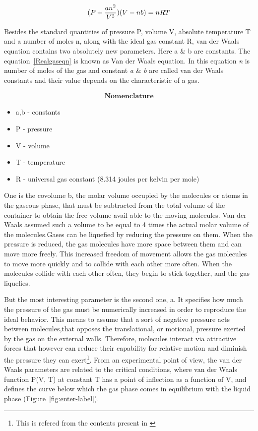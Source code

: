 \documentclass[12pt,a4paper]{article}
\begin{document}
\begin{equation}
	\text(P + \frac{an^2}{V^2})(V - nb) = nRT
        \label{Realgaseqn}
\end{equation}

Besides the standard quantities of pressure P, volume V, absolute temperature T and a number of moles n, along with the ideal gas constant R, van der Waals equation contains two absolutely new parameters. Here a \& b are constants. The equation~\ref{Realgaseqn} is known as Van der Waals equation. In this equation \textit{n} is number of moles of the gas and constant \textit{a} \& \textit{b} are called van der Waals constants and their value depends on the characteristic of a gas.

\begin{align}
    \textbf{Nomenclature}
\end{align}
\begin{itemize}
\item a,b - constants
\item P - pressure
\item V - volume
\item T - temperature
\item R - universal gas constant (8.314 joules per kelvin per mole)
\end{itemize}

One is the covolume b,  the  molar  volume  occupied  by  the  molecules  or  atoms  in  the  gaseous  phase,  that  must  be  subtracted from the total volume of the container to obtain the free volume avail-able to the moving molecules. Van der Waals assumed such a volume to be equal to 4 times the actual molar volume of the molecules.Gases can be liquefied by reducing the pressure on them. When the pressure is reduced, the gas molecules have more space between them and can move more freely. This increased freedom of movement allows the gas molecules to move more quickly and to collide with each other more often. When the molecules collide with each other often, they begin to stick together, and the gas liquefies.

But the most interesting parameter is the second one, a. It specifies how much the pressure of the gas must be numerically increased in order to reproduce the ideal behavior. This means to assume that a sort of negative pressure acts between molecules,that opposes the translational, or motional, pressure exerted by the gas on the external walls. Therefore, molecules interact via attractive forces that however can reduce their capability for relative motion and diminish the pressure they can exert\footnote{This is refered from the contents present in \cite{della2022van}}. From an experimental point of view, the van der Waals parameters are related to the critical conditions, where van der Waals function P(V, T) at constant T has a point of inflection as a function of V, and defines the curve below which the gas phase comes in equilibrium with the liquid phase (Figure~\ref{fig:enter-label}).
\end{document}
